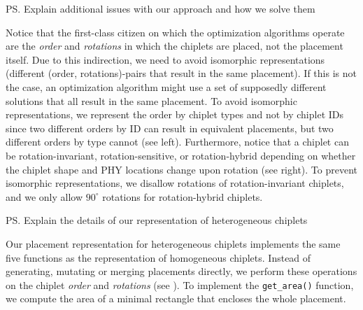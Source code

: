 

\ps{Explain additional issues with our approach and how we solve them}

Notice that the first-class citizen on which the optimization algorithms operate are the \emph{order} and \emph{rotations} in which the chiplets are placed, not the placement itself.
Due to this indirection, we need to avoid isomorphic representations (different (order, rotations)-pairs that result in the same placement). 
If this is not the case, an optimization algorithm might use a set of supposedly different solutions that all result in the same placement.
To avoid isomorphic representations, we represent the order by chiplet types and not by chiplet IDs since two different orders by ID can result in equivalent placements, but two different orders by type cannot (see  left).
Furthermore, notice that a chiplet can be rotation-invariant, rotation-sensitive, or rotation-hybrid depending on whether the chiplet shape and PHY locations change upon rotation (see  right).
To prevent isomorphic representations, we disallow rotations of rotation-invariant chiplets, and we only allow $90^\circ$ rotations for rotation-hybrid chiplets.


\vspace{-1em}


\ps{Explain the details of our representation of heterogeneous chiplets}

Our placement representation for heterogeneous chiplets implements the same five functions as the representation of homogeneous chiplets.
Instead of generating, mutating or merging placements directly, we perform these operations on the chiplet \emph{order} and \emph{rotations} (see ).
To implement the \texttt{get\_area()} function, we compute the area of a minimal rectangle that encloses the whole placement.



